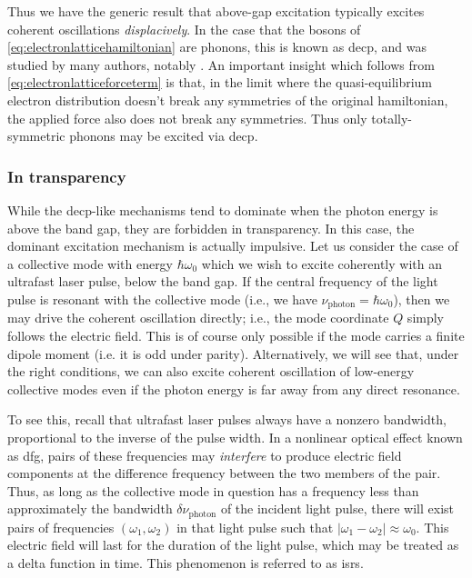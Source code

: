 Thus we have the generic result that above-gap excitation typically excites coherent oscillations \emph{displacively}.
In the case that the bosons of \cref{eq:electronlatticehamiltonian} are phonons, this is known as \gls{decp}, and was studied by many authors, notably \citet{zeiger_theory_1992}.
An important insight which follows from \cref{eq:electronlatticeforceterm} is that, in the limit where the quasi-equilibrium electron distribution doesn't break any symmetries of the original hamiltonian, the applied force also does not break any symmetries.
Thus only totally-symmetric phonons may be excited via \gls{decp}.

\subsubsection{In transparency}

While the \gls{decp}-like mechanisms tend to dominate when the photon energy is above the band gap, they are forbidden in transparency.
In this case, the dominant excitation mechanism is actually impulsive.
Let us consider the case of a collective mode with energy $\hbar\omega_0$ which we wish to excite coherently with an ultrafast laser pulse, below the band gap.
If the central frequency of the light pulse is resonant with the collective mode (i.e., we have $\nu_\mathrm{photon}=\hbar\omega_0$), then we may drive the coherent oscillation directly; i.e., the mode coordinate $Q$ simply follows the electric field.
This is of course only possible if the mode carries a finite dipole moment (i.e. it is odd under parity).
Alternatively, we will see that, under the right conditions, we can also excite coherent oscillation of low-energy collective modes even if the photon energy is far away from any direct resonance.

To see this, recall that ultrafast laser pulses always have a nonzero bandwidth, proportional to the inverse of the pulse width.
In a nonlinear optical effect known as \gls{dfg}, pairs of these frequencies may \emph{interfere} to produce electric field components at the difference frequency between the two members of the pair.
Thus, as long as the collective mode in question has a frequency less than approximately the bandwidth $\delta \nu_\mathrm{photon}$ of the incident light pulse, there will exist pairs of frequencies $(\omega_1,\omega_2)$ in that light pulse such that $|\omega_1-\omega_2|\approx\omega_0$.
This electric field will last for the duration of the light pulse, which may be treated as a delta function in time.
This phenomenon is referred to as \gls{isrs}.

